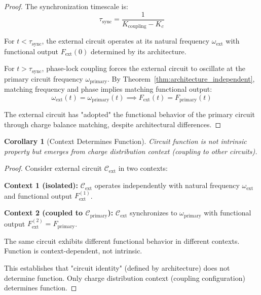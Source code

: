\documentclass[12pt,a4paper]{article}
\theoremstyle{plain}
\newtheorem{corollary}[theorem]{Corollary}
\theoremstyle{definition}
\theoremstyle{remark}
\begin{document}
\begin{proof}
The synchronization timescale is:
\begin{equation}
\tau_{\text{sync}} = \frac{1}{K_{\text{coupling}} - K_c}
\end{equation}

For $t < \tau_{\text{sync}}$, the external circuit operates at its natural frequency $\omega_{\text{ext}}$ with functional output $F_{\text{ext}}(0)$ determined by its architecture.

For $t > \tau_{\text{sync}}$, phase-lock coupling forces the external circuit to oscillate at the primary circuit frequency $\omega_{\text{primary}}$. By Theorem~\ref{thm:architecture_independent}, matching frequency and phase implies matching functional output:
\begin{equation}
\omega_{\text{ext}}(t) = \omega_{\text{primary}}(t) \implies F_{\text{ext}}(t) = F_{\text{primary}}(t)
\end{equation}

The external circuit has "adopted" the functional behavior of the primary circuit through charge balance matching, despite architectural differences.
\end{proof}

\begin{corollary}[Context Determines Function]
\label{cor:context_function}
Circuit function is not intrinsic property but emerges from charge distribution context (coupling to other circuits).
\end{corollary}

\begin{proof}
Consider external circuit $\mathcal{C}_{\text{ext}}$ in two contexts:

\textbf{Context 1 (isolated):} $\mathcal{C}_{\text{ext}}$ operates independently with natural frequency $\omega_{\text{ext}}$ and functional output $F_{\text{ext}}^{(1)}$.

\textbf{Context 2 (coupled to $\mathcal{C}_{\text{primary}}$):} $\mathcal{C}_{\text{ext}}$ synchronizes to $\omega_{\text{primary}}$ with functional output $F_{\text{ext}}^{(2)} = F_{\text{primary}}$.

The same circuit exhibits different functional behavior in different contexts. Function is context-dependent, not intrinsic.

This establishes that "circuit identity" (defined by architecture) does not determine function. Only charge distribution context (coupling configuration) determines function.
\end{proof}
\end{document}
